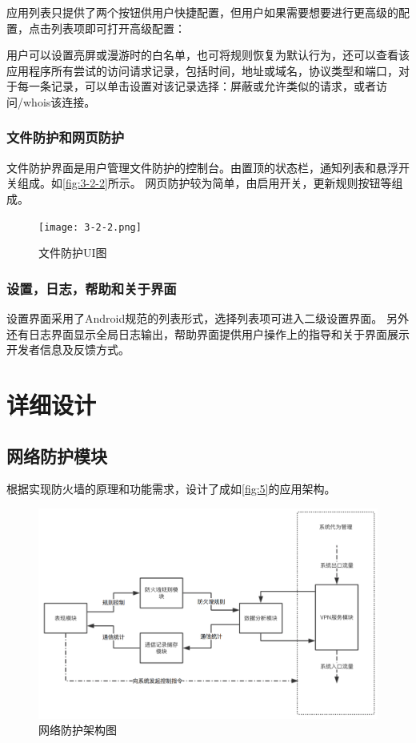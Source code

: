 \documentclass[format=final, language=chinese, degree=fyp]{hustthesis}
\begin{document}
应用列表只提供了两个按钮供用户快捷配置，但用户如果需要想要进行更高级的配置，点击列表项即可打开高级配置：

用户可以设置亮屏或漫游时的白名单，也可将规则恢复为默认行为，还可以查看该应用程序所有尝试的访问请求记录，包括时间，地址或域名，协议类型和端口，对于每一条记录，可以单击设置对该记录选择：屏蔽或允许类似的请求，或者访问/whois该连接。



\subsection{文件防护和网页防护}

文件防护界面是用户管理文件防护的控制台。由置顶的状态栏，通知列表和悬浮开关组成。如\autoref{fig:3-2-2}所示。
网页防护较为简单，由启用开关，更新规则按钮等组成。

\begin{figure}[!h]
	\centering
	\texttt{[image: 3-2-2.png]}
	\caption{文件防护UI图}\label{fig:3-2-2}
\end{figure}

\subsection{设置，日志，帮助和关于界面}
设置界面采用了Android规范的列表形式，选择列表项可进入二级设置界面。
另外还有日志界面显示全局日志输出，帮助界面提供用户操作上的指导和关于界面展示开发者信息及反馈方式。

\chapter{详细设计}

\section{网络防护模块}

根据实现防火墙的原理和功能需求，设计了成如\autoref{fig:5}的应用架构。

\begin{figure}[!h]
\centering
\includegraphics[width=1\textwidth]{function_1_ori.png}
\caption{网络防护架构图}\label{fig:5}
\end{figure}
\end{document}
